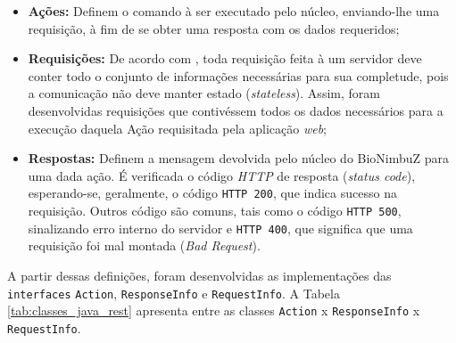 \begin{itemize}
	\item \textbf{Ações:} Definem o comando à ser executado pelo núcleo, enviando-lhe uma requisição, à fim de se obter uma resposta com os dados requeridos;
	\item \textbf{Requisições:} De acordo com \cite{rest}, toda requisição feita à um servidor deve conter todo o conjunto de informações necessárias para sua completude, pois a comunicação não deve manter estado (\textit{stateless}). Assim, foram desenvolvidas requisições que contivéssem todos os dados necessários para a execução daquela Ação requisitada pela aplicação \textit{web};
	\item \textbf{Respostas:} Definem a mensagem devolvida pelo núcleo do BioNimbuZ para uma dada ação. É verificada o código \textit{HTTP} de resposta (\textit{status code}), esperando-se, geralmente, o código \texttt{HTTP 200}, que indica sucesso na requisição. Outros código são comuns, tais como o código \texttt{HTTP 500}, sinalizando erro interno do servidor e \texttt{HTTP 400}, que significa que uma requisição foi mal montada (\textit{Bad Request}).
\end{itemize} 

A partir dessas definições, foram desenvolvidas as implementações das \texttt{interfaces} \texttt{Action}, \texttt{ResponseInfo} e \texttt{RequestInfo}. A Tabela \ref{tab:classes_java_rest} apresenta entre as classes \texttt{Action} x \texttt{ResponseInfo} x \texttt{RequestInfo}.


